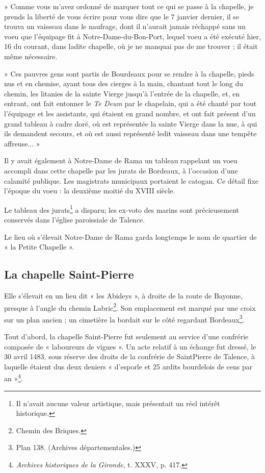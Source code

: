 » Comme vous m'avez ordonné de marquer tout ce qui se passe à la chapelle, je prends la liberté de vous écrire pour vous dire que le 7 janvier dernier, il se trouva un vaisseau dans le naufrage, dont il n'aurait jamais réchappé sans un voeu que l'équipage fit à Notre-Dame-du-Bon-Port, lequel voeu a été exécuté hier, 16 du courant, dans ladite chapelle, où je ne manquai pas de me trouver ; il était même nécessaire.

» Ces pauvres gens sont partis de Bourdeaux pour se rendre à la chapelle, pieds nus et en chemise, ayant tous des cierges à la main, chantant tout le long du chemin, les litanies de la sainte Vierge jusqu'à l'entrée de la chapelle, et, en entrant, ont fait entonner le \textit{Te Deum} par le chapelain, qui a été chanté par tout l'équipage et les assistants, qui étaient en grand nombre, et ont fait présent d'un grand tableau à cadre doré, où est représentée la sainte Vierge dans la nue, à qui ils demandent secours, et où est aussi représenté ledit vaisseau dans une tempête affreuse... »

Il y avait également à Notre-Dame de Rama un tableau rappelant un voeu accompli dans cette chapelle par les jurats de Bordeaux, à l'occasion d'une calamité publique. Les magistrats municipaux portaient le catogan. Ce détail fixe l'époque du voeu : la deuxième moitié du XVIII\ieme{} siècle.

Le tableau des jurats\footnote{Il n'avait aucune valeur artistique, mais présentait un réel intérêt historique.} a disparu; les ex-voto des marins sont précieusement conservés dans l'église paroissiale de Talence.

Le lieu où s'élevait Notre-Dame de Rama garda longtemps le nom de quartier de « la Petite Chapelle ».

\subsection{La chapelle Saint-Pierre}

Elle s'élevait en un lieu dit « les Abideys », à droite de la route de Bayonne, presque à l'angle du chemin Labric\footnote{Chemin des Briques.}. Son emplacement est marqué par une croix sur un plan ancien ; un cimetière la bordait sur le côté regardant Bordeaux\footnote{Plan 138. (Archives départementales.)}.

Tout d'abord, la chapelle Saint-Pierre fut seulement au service d'une confrérie composée de « laboureurs de vignes ». Un acte relatif à un échange fut dressé, le 30 avril 1483, sous réserve des droits de la confrérie de SaintPierre de Talence, à laquelle étaient dus deux deniers « d'esporle et 25 ardits bourdelois de cens par an »\footnote{\textit{Archives historiques de la Gironde}, t. XXXV, p. 417.}.

